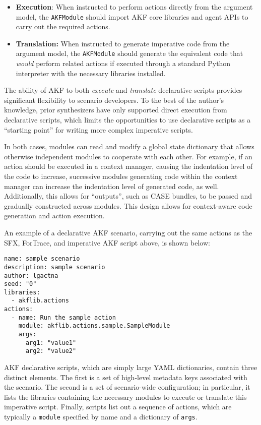 \documentclass[letterpaper,12pt]{report}
\def\tightlist{}
\newcommand{\passthrough}[1]{#1}
\begin{document}
\begin{itemize}
\tightlist
\item
  \textbf{Execution}: When instructed to perform actions directly from
  the argument model, the \passthrough{\lstinline!AKFModule!} should
  import AKF core libraries and agent APIs to carry out the required
  actions.
\item
  \textbf{Translation:} When instructed to generate imperative code from
  the argument model, the \passthrough{\lstinline!AKFModule!} should
  generate the equivalent code that \emph{would} perform related actions
  if executed through a standard Python interpreter with the necessary
  libraries installed.
\end{itemize}

The ability of AKF to both \emph{execute} and \emph{translate}
declarative scripts provides significant flexibility to scenario
developers. To the best of the author's knowledge, prior synthesizers
have only supported direct execution from declarative scripts, which
limits the opportunities to use declarative scripts as a ``starting
point'' for writing more complex imperative scripts.

In both cases, modules can read and modify a global state dictionary
that allows otherwise independent modules to cooperate with each other.
For example, if an action should be executed in a context manager,
causing the indentation level of the code to increase, successive
modules generating code within the context manager can increase the
indentation level of generated code, as well. Additionally, this allows
for ``outputs'', such as CASE bundles, to be passed and gradually
constructed across modules. This design allows for context-aware code
generation and action execution.

An example of a declarative AKF scenario, carrying out the same actions
as the SFX, ForTrace, and imperative AKF script above, is shown below:

\begin{lstlisting}
name: sample scenario
description: sample scenario
author: lgactna
seed: "0"
libraries:
  - akflib.actions
actions:
  - name: Run the sample action
    module: akflib.actions.sample.SampleModule
    args:
      arg1: "value1"
      arg2: "value2"
\end{lstlisting}

AKF declarative scripts, which are simply large YAML dictionaries,
contain three distinct elements. The first is a set of high-level
metadata keys associated with the scenario. The second is a set of
scenario-wide configuration; in particular, it lists the libraries
containing the necessary modules to execute or translate this imperative
script. Finally, scripts list out a sequence of actions, which are
typically a \passthrough{\lstinline!module!} specified by name and a
dictionary of \passthrough{\lstinline!args!}.
\end{document}
